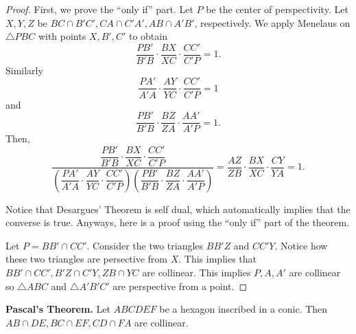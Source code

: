 \documentclass[a4paper]{article}
\theoremstyle{definition}
\begin{document}
\begin{proof}
First, we prove the ``only if'' part. Let $P$ be the center of perspectivity. Let $X, Y, Z$ be $BC \cap B'C', CA \cap C'A', AB \cap A'B'$, respectively. We apply Menelaus on $\triangle PBC$ with points $X, B', C'$ to obtain
\[ \frac{PB'}{B'B} \cdot \frac{BX}{XC} \cdot \frac{CC'}{C'P} = 1. \]
Similarly
\[ \frac{PA'}{A'A} \cdot \frac{AY}{YC} \cdot \frac{CC'}{C'P} = 1 \]
and
\[ \frac{PB'}{B'B} \cdot \frac{BZ}{ZA} \cdot \frac{AA'}{A'P} = 1. \]
Then,
\[ \frac{\dfrac{PB'}{B'B} \cdot \dfrac{BX}{XC} \cdot \dfrac{CC'}{C'P}}{\left(\dfrac{PA'}{A'A} \cdot \dfrac{AY}{YC} \cdot \dfrac{CC'}{C'P}\right) \left(\dfrac{PB'}{B'B} \cdot \dfrac{BZ}{ZA} \cdot \dfrac{AA'}{A'P}\right)} = \frac{AZ}{ZB} \cdot \frac{BX}{XC} \cdot \frac{CY}{YA} = 1. \]

Notice that Desargues' Theorem is self dual, which automatically implies that the converse is true. Anyways, here is a proof using the ``only if'' part of the theorem.

Let $P = BB' \cap CC'$. Consider the two triangles $BB'Z$ and $CC'Y$. Notice how these two triangles are persective from $X$. This implies that $BB' \cap CC', B'Z \cap C'Y, ZB \cap YC$ are collinear. This implies $P, A, A'$ are collinear so $\triangle ABC$ and $\triangle A'B'C'$ are perspective from a point.
\end{proof}

\textbf{Pascal's Theorem.} Let $ABCDEF$ be a hexagon inscribed in a conic. Then $AB \cap DE, BC \cap EF, CD \cap FA$ are collinear.
\end{document}
